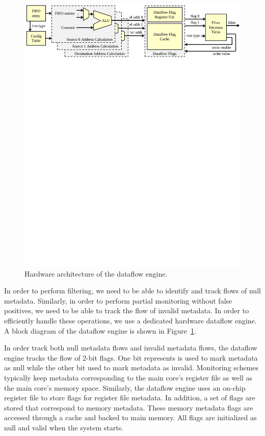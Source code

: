 \begin{figure}
  \begin{center}
    \includegraphics[width=\linewidth]{figs/dataflow_architecture.pdf}
    \vspace{-0.2in}
    \caption{Hardware architecture of the dataflow engine.}
    \label{fig:arch.dataflow} 
    \vspace{-0.1in}
  \end{center}
\end{figure}

In order to perform filtering, we need to be able to identify and track flows
of null metadata. Similarly, in order to perform partial monitoring without
false positives, we need to be able to track the flow of invalid metadata. In
order to efficiently handle these operations, we use a dedicated hardware
dataflow engine. A block diagram of the dataflow engine is shown in
Figure~\ref{fig:arch.dataflow}.

In order track both null metadata flows and invalid metadata flows, the
dataflow engine tracks the flow of 2-bit flags. One bit represents is used to
mark metadata as null while the other bit used to mark metadata as invalid.
Monitoring schemes typically keep metadata corresponding to the main core's
register file as well as the main core's memory space. Similarly, the dataflow
engine uses an on-chip register file to store flags for register file metadata.
In addition, a set of flags are stored that correspond to memory metadata.
These memory metadata flags are accessed through a cache and backed to main
memory. All flags are initialized as null and valid when the system starts. 

